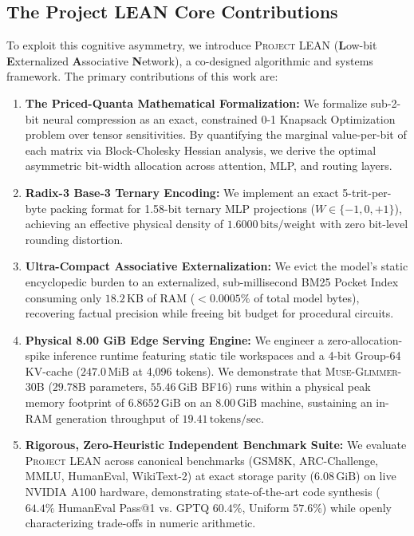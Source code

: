 \documentclass[10pt,twocolumn,letterpaper]{article}
\newcommand{\modelname}{\textsc{Muse-Glimmer-30B}}
\newcommand{\systemname}{\textsc{Project LEAN}}
\begin{document}
\subsection{The Project LEAN Core Contributions}
\label{sec:intro_contrib}
To exploit this cognitive asymmetry, we introduce \systemname{} (\textbf{L}ow-bit \textbf{E}xternalized \textbf{A}ssociative \textbf{N}etwork), a co-designed algorithmic and systems framework. The primary contributions of this work are:

\begin{enumerate}[leftmargin=*]
    \item \textbf{The Priced-Quanta Mathematical Formalization:} We formalize sub-2-bit neural compression as an exact, constrained 0-1 Knapsack Optimization problem over tensor sensitivities. By quantifying the marginal value-per-bit of each matrix via Block-Cholesky Hessian analysis, we derive the optimal asymmetric bit-width allocation across attention, MLP, and routing layers.
    \item \textbf{Radix-3 Base-3 Ternary Encoding:} We implement an exact 5-trit-per-byte packing format for 1.58-bit ternary MLP projections ($W \in \{-1, 0, +1\}$), achieving an effective physical density of $1.6000\,\text{bits/weight}$ with zero bit-level rounding distortion.
    \item \textbf{Ultra-Compact Associative Externalization:} We evict the model's static encyclopedic burden to an externalized, sub-millisecond BM25 Pocket Index consuming only $18.2\,\text{KB}$ of RAM ($<0.0005\%$ of total model bytes), recovering factual precision while freeing bit budget for procedural circuits.
    \item \textbf{Physical 8.00 GiB Edge Serving Engine:} We engineer a zero-allocation-spike inference runtime featuring static tile workspaces and a 4-bit Group-64 KV-cache ($247.0\,\text{MiB}$ at 4,096 tokens). We demonstrate that \modelname{} ($29.78\text{B}$ parameters, $55.46\,\text{GiB}$ BF16) runs within a physical peak memory footprint of \textbf{$6.8652\,\text{GiB}$} on an $8.00\,\text{GiB}$ machine, sustaining an in-RAM generation throughput of \textbf{$19.41\,\text{tokens/sec}$}.
    \item \textbf{Rigorous, Zero-Heuristic Independent Benchmark Suite:} We evaluate \systemname{} across canonical benchmarks (GSM8K, ARC-Challenge, MMLU, HumanEval, WikiText-2) at exact storage parity ($6.08\,\text{GiB}$) on live NVIDIA A100 hardware, demonstrating state-of-the-art code synthesis ($64.4\%$ HumanEval Pass@1 vs. GPTQ $60.4\%$, Uniform $57.6\%$) while openly characterizing trade-offs in numeric arithmetic.
\end{enumerate}
\end{document}
